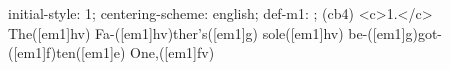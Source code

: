 initial-style: 1;
centering-scheme: english;
def-m1: \grealign;
(cb4) <c>1.</c> The([em1]hv) Fa-([em1]hv)ther's([em1]g) sole([em1]hv) be-([em1]g)got-([em1]f)ten([em1]e) One,([em1]fv)